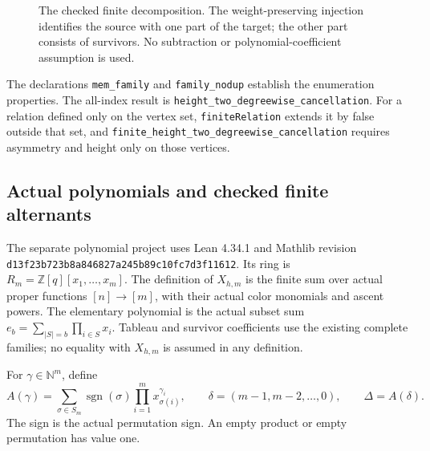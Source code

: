 \documentclass[11pt,a4paper]{article}
\theoremstyle{definition}
\newcommand{\N}{\mathbb N}
\begin{document}
\begin{figure}[ht]
\centering
{}
\caption{The checked finite decomposition. The weight-preserving injection
identifies the source with one part of the target; the other part consists
of survivors. No subtraction or polynomial-coefficient assumption is used.}
\end{figure}

The declarations \texttt{mem\_family} and \texttt{family\_nodup} establish the
enumeration properties. The all-index result is
\texttt{height\_two\_degreewise\_cancellation}. For a relation defined only
on the vertex set, \texttt{finiteRelation} extends it by false outside that
set, and \texttt{finite\_\allowbreak height\_\allowbreak two\_\allowbreak degreewise\_\allowbreak cancellation} requires
asymmetry and height only on those vertices.

\subsection{Actual polynomials and checked finite alternants}

The separate polynomial project uses Lean 4.34.1 and Mathlib revision
\texttt{d13f23b723b8a846827a\allowbreak 245b89c10fc7d3f11612}. Its ring is
$R_m=\mathbb Z[q][x_1,\ldots,x_m]$. The definition of $X_{h,m}$ is the
finite sum over actual proper functions $[n]\to[m]$, with their actual
color monomials and ascent powers. The elementary polynomial is the actual
subset sum $e_b=\sum_{|S|=b}\prod_{i\in S}x_i$. Tableau and survivor
coefficients use the existing complete families; no equality with $X_{h,m}$
is assumed in any definition.

For $\gamma\in\N^m$, define
\[
 A(\gamma)=\sum_{\sigma\in S_m}\operatorname{sgn}(\sigma)
       \prod_{i=1}^m x_{\sigma(i)}^{\gamma_i},\qquad
 \delta=(m-1,m-2,\ldots,0),\qquad \Delta=A(\delta).
\]
The sign is the actual permutation sign. An empty product or empty
permutation has value one.
\end{document}
